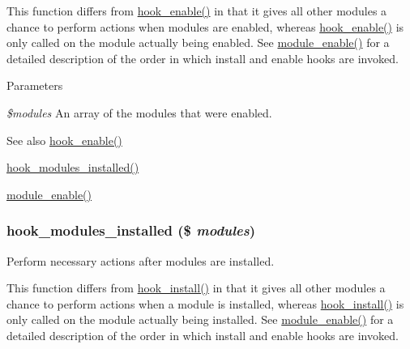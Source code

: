 This function differs from \hyperlink{group__hooks_gaedcfb58c08d5c5f8ffcd1059ceeb39e4}{hook\_\-enable()} in that it gives all other modules a chance to perform actions when modules are enabled, whereas \hyperlink{group__hooks_gaedcfb58c08d5c5f8ffcd1059ceeb39e4}{hook\_\-enable()} is only called on the module actually being enabled. See \hyperlink{module_8inc_a4b2c9ea60d7c88595eaebfc4abd5f1bf}{module\_\-enable()} for a detailed description of the order in which install and enable hooks are invoked.


\begin{DoxyParams}{Parameters}
\item[{\em \$modules}]An array of the modules that were enabled.\end{DoxyParams}
\begin{DoxySeeAlso}{See also}
\hyperlink{group__hooks_gaedcfb58c08d5c5f8ffcd1059ceeb39e4}{hook\_\-enable()} 

\hyperlink{group__hooks_ga71b7268520567cac1a2f296c205e5227}{hook\_\-modules\_\-installed()} 

\hyperlink{module_8inc_a4b2c9ea60d7c88595eaebfc4abd5f1bf}{module\_\-enable()} 
\end{DoxySeeAlso}
\hypertarget{group__hooks_ga71b7268520567cac1a2f296c205e5227}{
\subsubsection[{hook\_\-modules\_\-installed}]{\setlength{\rightskip}{0pt plus 5cm}hook\_\-modules\_\-installed (\$ {\em modules})}}
\label{group__hooks_ga71b7268520567cac1a2f296c205e5227}
Perform necessary actions after modules are installed.

This function differs from \hyperlink{group__hooks_ga1ecdb5a2a046ea63dc790c3ed90338e5}{hook\_\-install()} in that it gives all other modules a chance to perform actions when a module is installed, whereas \hyperlink{group__hooks_ga1ecdb5a2a046ea63dc790c3ed90338e5}{hook\_\-install()} is only called on the module actually being installed. See \hyperlink{module_8inc_a4b2c9ea60d7c88595eaebfc4abd5f1bf}{module\_\-enable()} for a detailed description of the order in which install and enable hooks are invoked.



